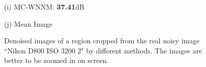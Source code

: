 \documentclass[10pt,onecolumn,letterpaper]{article}
\begin{document}
\begin{figure}
{\begin{minipage}[t]{0.195\textwidth}
{\footnotesize (i) MC-WNNM: \textbf{37.41}dB}
\end{minipage}
\begin{minipage}[t]{0.195\textwidth}
\centering
{}
{\footnotesize (j) Mean Image \cite{crosschannel2016}}
\end{minipage}
}
\caption{Denoised images of a region cropped from the real noisy image ``Nikon D800 ISO 3200 2" \cite{crosschannel2016} by different methods. The images are better to be zoomed in on screen.}
\label{fig5}
\end{figure}
\end{document}
